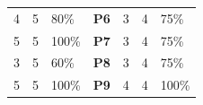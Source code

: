\begin{table}[]
\begin{tabular}{rrlcrrl}
\rowcolor{yellow}
4                                                                                             & 5                                                                                          & 80\%                                                                                    & \textbf{P6}                              & 3                                                                                             & 4                                                                                          & 75\%                                                                                     \\
\rowcolor{yellow}
5                                                                                             & 5                                                                                          & 100\%                                                                                   & \textbf{P7}                              & 3                                                                                             & 4                                                                                          & 75\%                                                                                     \\
3                                                                                             & 5                                                                                          & 60\%                                                                                    & \textbf{P8}                              & 3                                                                                             & 4                                                                                          & 75\%                                                                                     \\
5                                                                                             & 5                                                                                          & 100\%                                                                                   & \textbf{P9}                              & 4                                                                                             & 4                                                                                          & 100\%                                                                                    \\

\end{tabular}
\end{table}
